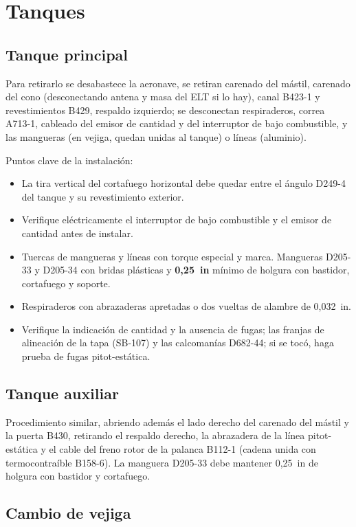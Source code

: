 \section{Tanques}

\subsection{Tanque principal}

Para retirarlo se desabastece la aeronave, se retiran carenado del mástil, carenado del cono (desconectando antena y masa del ELT si lo hay), canal B423-1 y revestimientos B429, respaldo izquierdo; se desconectan respiraderos, correa A713-1, cableado del emisor de cantidad y del interruptor de bajo combustible, y las mangueras (en vejiga, quedan unidas al tanque) o líneas (aluminio).

Puntos clave de la instalación:
\begin{itemize}
\item La tira vertical del cortafuego horizontal debe quedar entre el ángulo D249-4 del tanque y su revestimiento exterior.
\item Verifique eléctricamente el interruptor de bajo combustible y el emisor de cantidad antes de instalar.
\item Tuercas de mangueras y líneas con torque especial y marca. Mangueras D205-33 y D205-34 con bridas plásticas y \textbf{0,25~in} mínimo de holgura con bastidor, cortafuego y soporte.
\item Respiraderos con abrazaderas apretadas o dos vueltas de alambre de 0,032~in.
\item Verifique la indicación de cantidad y la ausencia de fugas; las franjas de alineación de la tapa (SB-107) y las calcomanías D682-44; si se tocó, haga prueba de fugas pitot-estática.
\end{itemize}

\subsection{Tanque auxiliar}

Procedimiento similar, abriendo además el lado derecho del carenado del mástil y la puerta B430, retirando el respaldo derecho, la abrazadera de la línea pitot-estática y el cable del freno rotor de la palanca B112-1 (cadena unida con termocontraíble B158-6). La manguera D205-33 debe mantener 0,25~in de holgura con bastidor y cortafuego.

\subsection{Cambio de vejiga}

